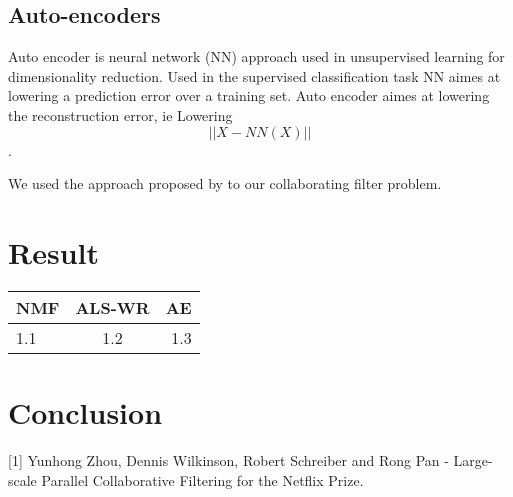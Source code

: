 \documentclass[10pt,twocolumn]{article}
\begin{document}
\subsection{Auto-encoders}

Auto encoder is neural network (NN) approach used in unsupervised learning for dimensionality reduction. Used in the supervised classification task NN aimes at lowering a prediction error over a training set. Auto encoder aimes at lowering the reconstruction error, ie Lowering $$ || X - NN(X) || $$. 

We used the approach proposed by \cite{strub2016hybrid} to our collaborating filter problem. 

\section{Result}

\begin{tabular}{|l|c|r|}
  \hline
  NMF & ALS-WR & AE \\
  \hline
  1.1 & 1.2 & 1.3 \\
  
  \hline
\end{tabular}


\section{Conclusion}

[1] Yunhong Zhou, Dennis Wilkinson, Robert Schreiber and Rong Pan - Large-scale Parallel Collaborative Filtering for the Netflix Prize.


\end{document}
